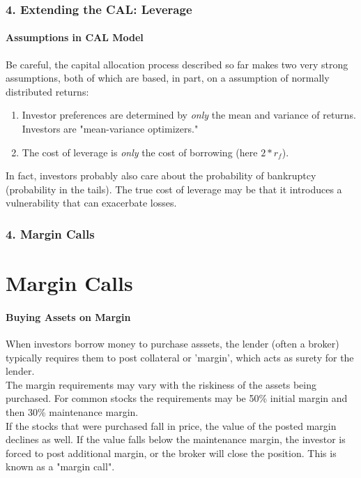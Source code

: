\documentclass{beamer}
\begin{document}
\begin{cautionframe}[t]
    \frametitle{4. Extending the CAL: Leverage}
    \framesubtitle{Assumptions in CAL Model}

    Be careful, the capital allocation process described so far makes 
    two very strong assumptions, 
    both of which are based, in part, on a assumption of normally distributed returns:
    \begin{enumerate}
        \item Investor preferences are determined by \textit{only} the mean and variance of returns.   
        Investors are "mean-variance optimizers."
        \item The cost of leverage is \textit{only} the cost of borrowing (here $2*r_{f}$).
    \end{enumerate}
    In fact, investors probably also care about the probability of bankruptcy (probability in the tails).  
    The true cost of leverage may be that it introduces a vulnerability  
    that can exacerbate losses.

\end{cautionframe}


\begin{frame}[t]
    \frametitle{4. Margin Calls}
    \section{Margin Calls}
    \framesubtitle{Buying Assets on Margin}

    When investors borrow money to purchase asssets,  the lender (often a broker) typically requires them to post collateral or 'margin', which acts as surety for the lender.\\
    \vspace{1em}
    The margin requirements may vary with the riskiness of the assets being purchased.  For common stocks the requirements may be 50\% initial margin and then 30\% maintenance margin.\\
    \vspace{1em}
    If the stocks that were purchased fall in price, the value of the posted margin declines as well.  If the value falls below the maintenance margin, the investor is forced to post additional margin, or the broker will close the position.  This is known as a "margin call".

\end{frame}
\end{document}

